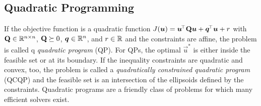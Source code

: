 		\subsection{Quadratic Programming}
			If the objective function is a quadratic function \( J(\bm{u}) = \bm{u}^{\!\top} \bm{\mathrm{Q}} \bm{u} + \bm{q}^{\!\top} \bm{u} + r \) with \( \bm{\mathrm{Q}} \in \mathbb{R}^{n \times n} \), \( \bm{\mathrm{Q}} \succeq 0 \), \( \bm{q} \in \mathbb{R}^n \), and \( r \in \mathbb{R} \) and the constraints are affine, the problem is called q \emph{quadratic program} (QP). For QPs, the optimal \(\vec{u}^\ast\) is either inside the feasible set or at its boundary. If the inequality constraints are quadratic and convex, too, the problem is called a \emph{quadratically constrained quadratic program} (QCQP) and the feasible set is an intersection of the ellipsoids defined by the constraints. Quadratic programs are a friendly class of problems for which many efficient solvers exist.

